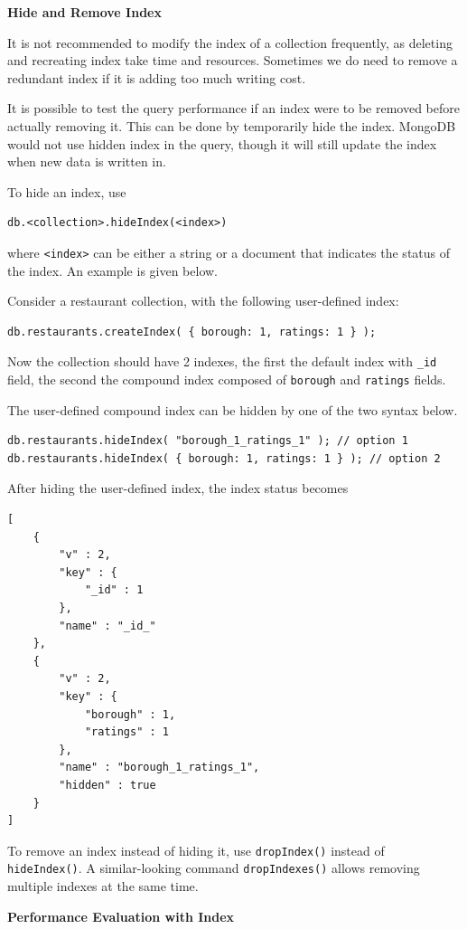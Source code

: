 \vspace{0.1in}
\noindent \textbf{Hide and Remove Index}
\vspace{0.1in}

It is not recommended to modify the index of a collection frequently, as deleting and recreating index take time and resources. Sometimes we do need to remove a redundant index if it is adding too much writing cost.

It is possible to test the query performance if an index were to be removed before actually removing it. This can be done by temporarily hide the index. MongoDB would not use hidden index in the query, though it will still update the index when new data is written in.

To hide an index, use
\begin{lstlisting}
db.<collection>.hideIndex(<index>)
\end{lstlisting}
where \verb|<index>| can be either a string or a document that indicates the status of the index. An example is given below.

Consider a restaurant collection, with the following user-defined index:
\begin{lstlisting}
db.restaurants.createIndex( { borough: 1, ratings: 1 } );
\end{lstlisting}
Now the collection should have 2 indexes, the first the default index with \verb|_id| field, the second the compound index composed of \verb|borough| and \verb|ratings| fields.

The user-defined compound index can be hidden by one of the two syntax below.
\begin{lstlisting}
db.restaurants.hideIndex( "borough_1_ratings_1" ); // option 1
db.restaurants.hideIndex( { borough: 1, ratings: 1 } ); // option 2
\end{lstlisting}

After hiding the user-defined index, the index status becomes
\begin{lstlisting}
[
	{
		"v" : 2,
		"key" : {
			"_id" : 1
		},
		"name" : "_id_"
	},
	{
		"v" : 2,
		"key" : {
			"borough" : 1,
			"ratings" : 1
		},
		"name" : "borough_1_ratings_1",
		"hidden" : true
	}
]
\end{lstlisting}

To remove an index instead of hiding it, use \verb|dropIndex()| instead of \verb|hideIndex()|. A similar-looking command \verb|dropIndexes()| allows removing multiple indexes at the same time.

\vspace{0.1in}
\noindent \textbf{Performance Evaluation with Index}
\vspace{0.1in}

